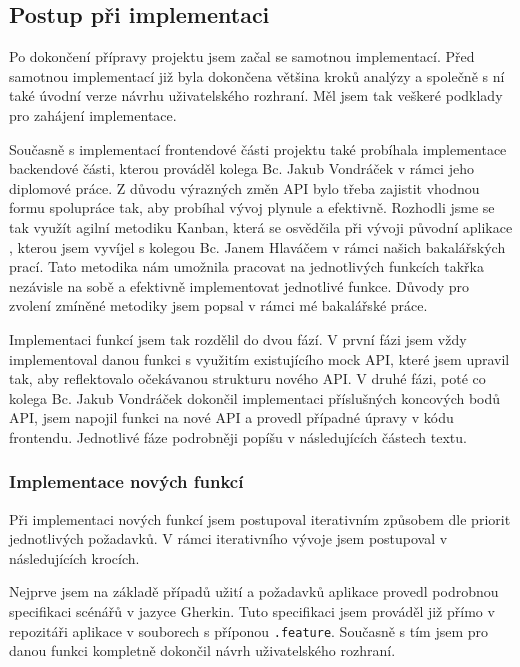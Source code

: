 
\subsection{Postup při implementaci}

Po dokončení přípravy projektu jsem začal se samotnou implementací. Před samotnou implementací již byla dokončena většina kroků analýzy a společně s ní také úvodní verze návrhu uživatelského rozhraní. Měl jsem tak veškeré podklady pro zahájení implementace.

Současně s implementací frontendové části projektu také probíhala implementace backendové části, kterou prováděl kolega Bc. Jakub Vondráček v rámci jeho diplomové práce. Z důvodu výrazných změn API bylo třeba zajistit vhodnou formu spolupráce tak, aby probíhal vývoj plynule a efektivně. Rozhodli jsme se tak využít agilní metodiku Kanban, která se osvědčila při vývoji původní aplikace \cite{Jenicek2024BachelorThesis}, kterou jsem vyvíjel s kolegou Bc. Janem Hlaváčem v rámci našich bakalářských prací. Tato metodika nám umožnila pracovat na jednotlivých funkcích takřka nezávisle na sobě a efektivně implementovat jednotlivé funkce. Důvody pro zvolení zmíněné metodiky jsem popsal v rámci mé bakalářské práce.

Implementaci funkcí jsem tak rozdělil do dvou fází. V první fázi jsem vždy implementoval danou funkci s využitím existujícího mock API, které jsem upravil tak, aby reflektovalo očekávanou strukturu nového API. V druhé fázi, poté co kolega Bc. Jakub Vondráček dokončil implementaci příslušných koncových bodů API, jsem napojil funkci na nové API a provedl případné úpravy v kódu frontendu. Jednotlivé fáze podrobněji popíšu v následujících částech textu.

\subsubsection{Implementace nových funkcí}

Při implementaci nových funkcí jsem postupoval iterativním způsobem dle priorit jednotlivých požadavků. V rámci iterativního vývoje jsem postupoval v následujících krocích.

Nejprve jsem na základě případů užití a požadavků aplikace provedl podrobnou specifikaci scénářů v jazyce Gherkin. Tuto specifikaci jsem prováděl již přímo v repozitáři aplikace v souborech s příponou \texttt{.feature}. Současně s tím jsem pro danou funkci kompletně dokončil návrh uživatelského rozhraní.

